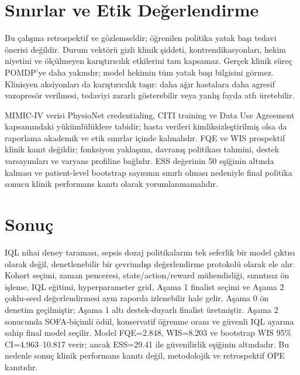 \documentclass[conference]{IEEEtran}
\begin{document}
\section{Sınırlar ve Etik Değerlendirme}
Bu çalışma retrospektif ve gözlemseldir; öğrenilen politika yatak başı tedavi önerisi değildir. Durum vektörü gizli klinik şiddeti, kontrendikasyonları, hekim niyetini ve ölçülmeyen karıştırıcılık etkilerini tam kapsamaz. Gerçek klinik süreç POMDP'ye daha yakındır; model hekimin tüm yatak başı bilgisini görmez. Klinisyen aksiyonları da karıştırıcılık taşır: daha ağır hastalara daha agresif vazopresör verilmesi, tedaviyi zararlı gösterebilir veya yanlış fayda atfı üretebilir.

MIMIC-IV verisi PhysioNet credentialing, CITI training ve Data Use Agreement kapsamındaki yükümlülüklere tabidir; hasta verileri kimliksizleştirilmiş olsa da raporlama akademik ve etik sınırlar içinde kalmalıdır. FQE ve WIS prospektif klinik kanıt değildir; fonksiyon yaklaşımı, davranış politikası tahmini, destek varsayımları ve varyans profiline bağlıdır. ESS değerinin 50 eşiğinin altında kalması ve patient-level bootstrap sayısının sınırlı olması nedeniyle final politika sonucu klinik performans kanıtı olarak yorumlanmamalıdır.

\section{Sonuç}
IQL nihai deney taraması, sepsis dozaj politikalarını tek seferlik bir model çıktısı olarak değil, denetlenebilir bir çevrimdışı değerlendirme protokolü olarak ele alır. Kohort seçimi, zaman penceresi, state/action/reward mühendisliği, sızıntısız ön işleme, IQL eğitimi, hyperparameter grid, Aşama 1 finalist seçimi ve Aşama 2 çoklu-seed değerlendirmesi aynı raporda izlenebilir hale gelir. Aşama 0 ön denetim geçilmiştir; Aşama 1 altı destek-duyarlı finalist üretmiştir. Aşama 2 sonucunda SOFA-biçimli ödül, konservatif öğrenme oranı ve güvenli IQL ayarına sahip final model seçilir. Model FQE=2.848, WIS=8.203 ve bootstrap WIS 95\% CI=4.963--10.817 verir; ancak ESS=29.41 ile güvenilirlik eşiğinin altındadır. Bu nedenle sonuç klinik performans kanıtı değil, metodolojik ve retrospektif OPE kanıtıdır.



\end{document}
